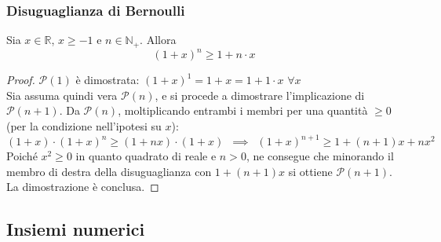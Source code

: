 \documentclass[10pt]{article}
\theoremstyle{plain}
\begin{document}
\subsubsection{Disuguaglianza di Bernoulli}
\begin{prop}
    Sia $x \in \mathbb{R}$, $x \geq -1$ e $n \in \mathbb{N}_+$. Allora
    \[(1+x)^n \geq 1 + n\cdot x\]
\end{prop}
\begin{proof}
$\mathcal{P}(1)$ è dimostrata: $(1 + x)^1 = 1 + x = 1 + 1 \cdot x$ $\forall x$
\\Sia assuma quindi vera $\mathcal{P}(n)$, e si procede a dimostrare l'implicazione di $\mathcal{P}(n+1)$. Da $\mathcal{P}(n)$, moltiplicando entrambi i membri per una quantità $\geq 0$ (per la condizione nell'ipotesi su $x$):
\[(1 + x) \cdot (1 + x)^n \geq (1 + n x) \cdot (1+x) \enspace \implies \enspace (1+x)^{n+1} \geq 1 + (n+1) x + n x^2\]
Poiché $x^2 \geq 0$ in quanto quadrato di reale e $n > 0$, ne consegue che minorando il membro di destra della disuguaglianza con $1 + (n+1) x$ si ottiene $\mathcal{P}(n+1)$. La dimostrazione è conclusa.
\end{proof}

\subsection{Insiemi numerici}
\end{document}
